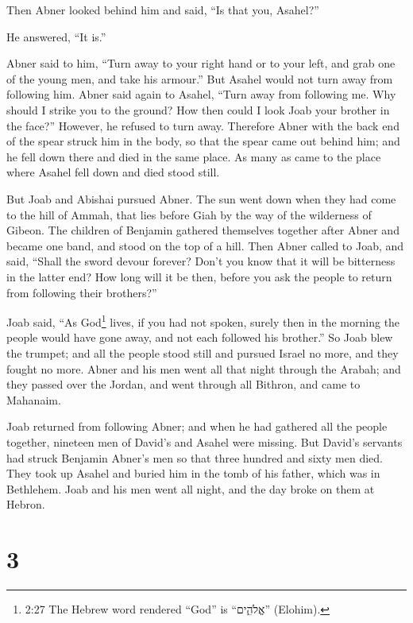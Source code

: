  Then Abner looked behind him and said, ``Is that you,
Asahel?''

He answered, ``It is.''

 Abner said to him, ``Turn away to your right hand or to
your left, and grab one of the young men, and take his armour.'' But
Asahel would not turn away from following him.  Abner said
again to Asahel, ``Turn away from following me. Why should I strike you
to the ground? How then could I look Joab your brother in the face?''
 However, he refused to turn away. Therefore Abner with the
back end of the spear struck him in the body, so that the spear came out
behind him; and he fell down there and died in the same place. As many
as came to the place where Asahel fell down and died stood still.

 But Joab and Abishai pursued Abner. The sun went down when
they had come to the hill of Ammah, that lies before Giah by the way of
the wilderness of Gibeon.  The children of Benjamin
gathered themselves together after Abner and became one band, and stood
on the top of a hill.  Then Abner called to Joab, and said,
``Shall the sword devour forever? Don't you know that it will be
bitterness in the latter end? How long will it be then, before you ask
the people to return from following their brothers?''

 Joab said, ``As God\footnote{2:27 The Hebrew word rendered
  ``God'' is ``אֱלֹהִ֑ים'' (Elohim).} lives, if you had not spoken,
surely then in the morning the people would have gone away, and not each
followed his brother.''  So Joab blew the trumpet; and all
the people stood still and pursued Israel no more, and they fought no
more.  Abner and his men went all that night through the
Arabah; and they passed over the Jordan, and went through all Bithron,
and came to Mahanaim.

 Joab returned from following Abner; and when he had
gathered all the people together, nineteen men of David's and Asahel
were missing.  But David's servants had struck Benjamin
Abner's men so that three hundred and sixty men died.  They
took up Asahel and buried him in the tomb of his father, which was in
Bethlehem. Joab and his men went all night, and the day broke on them at
Hebron.

\hypertarget{section-2}{%
\section{3}\label{section-2}}

